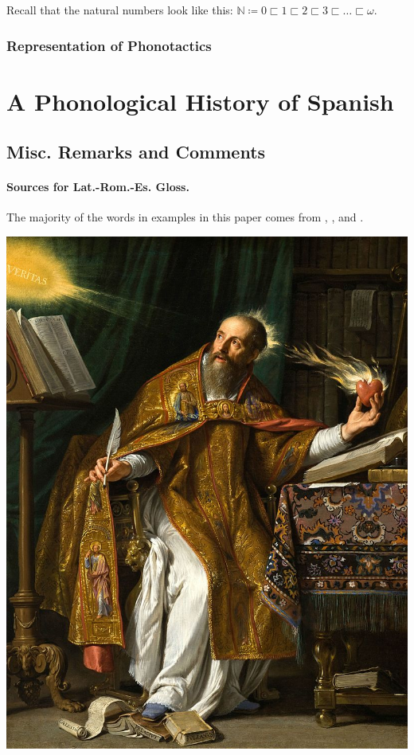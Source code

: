 \documentclass{report}[12pt]
\begin{document}
Recall that the natural numbers look like this: $\mathbb{N} \coloneq 0 \sqsubset 1 \sqsubset 2 \sqsubset 3 \sqsubset \dots \sqsubset \omega$.

\section{Representation of Phonotactics}

\part{A Phonological History of Spanish}

\chapter{Misc. Remarks and Comments}

\subsection*{Sources for Lat.-Rom.-Es. Gloss.}

The majority of the words in examples in this paper comes from \cite{romance_his}, \cite{lloyd_spanish}, and \cite{penny_spanish}. 

\pagebreak

\includegraphics[scale=0.5]{augustine.jpg}
\end{document}
